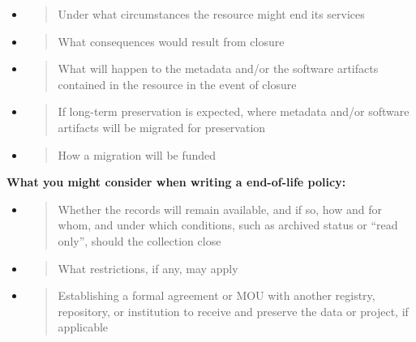 \documentclass[]{article}
\begin{document}
\begin{itemize}
\item
  \begin{quote}
  Under what circumstances the resource might end its services
  \end{quote}
\item
  \begin{quote}
  What consequences would result from closure
  \end{quote}
\item
  \begin{quote}
  What will happen to the metadata and/or the software artifacts
  contained in the resource in the event of closure
  \end{quote}
\item
  \begin{quote}
  If long-term preservation is expected, where metadata and/or software
  artifacts will be migrated for preservation
  \end{quote}
\item
  \begin{quote}
  How a migration will be funded
  \end{quote}
\end{itemize}

\textbf{What you might consider when writing a end-of-life policy:}

\begin{itemize}
\item
  \begin{quote}
  Whether the records will remain available, and if so, how and for
  whom, and under which conditions, such as archived status or ``read
  only'', should the collection close
  \end{quote}
\item
  \begin{quote}
  What restrictions, if any, may apply
  \end{quote}
\item
  \begin{quote}
  Establishing a formal agreement or MOU with another registry,
  repository, or institution to receive and preserve the data or
  project, if applicable
  \end{quote}
\end{itemize}

\section{\texorpdfstring{\\
}{ }}\label{section-10}
\end{document}
